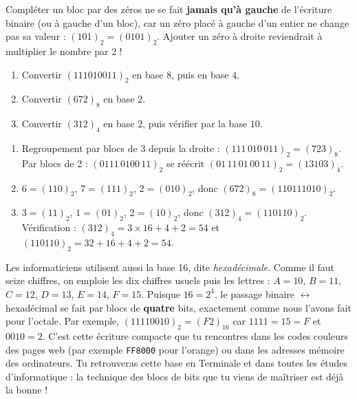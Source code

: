 \documentclass[11pt]{article}
\newcommand{\cle}[1]{{\popxbold\color{popdark}#1}}
\begin{document}
\begin{attention}
Compléter un bloc par des zéros ne se fait \textbf{jamais qu'à gauche} de l'écriture binaire (ou à gauche d'un bloc), car un zéro placé à gauche d'un entier ne change pas sa valeur : $(101)_2 = (0101)_2$. Ajouter un zéro à droite reviendrait à multiplier le nombre par $2$ !
\end{attention}

\begin{exercice}
\begin{enumerate}
\item Convertir $(111010011)_2$ en base $8$, puis en base $4$.
\item Convertir $(672)_8$ en base $2$.
\item Convertir $(312)_4$ en base $2$, puis vérifier par la base $10$.
\end{enumerate}
\end{exercice}

\begin{corrige}
\begin{enumerate}
\item Regroupement par blocs de 3 depuis la droite : $(111\,010\,011)_2 = (723)_8$. Par blocs de 2 : $(0111\,0100\,11)_2$ se réécrit $(01\,11\,01\,00\,11)_2 = (13103)_4$.
\item $6 = (110)_2$, $7 = (111)_2$, $2 = (010)_2$, donc $(672)_8 = (110111010)_2$.
\item $3 = (11)_2$, $1 = (01)_2$, $2 = (10)_2$, donc $(312)_4 = (110110)_2$. Vérification : $(312)_4 = 3\times 16 + 4 + 2 = 54$ et $(110110)_2 = 32 + 16 + 4 + 2 = 54$.
\end{enumerate}
\end{corrige}

\begin{savaistu}
Les informaticiens utilisent aussi la \cle{base 16}, dite \emph{hexadécimale}. Comme il faut seize chiffres, on emploie les dix chiffres usuels puis les lettres : $A = 10$, $B = 11$, $C = 12$, $D = 13$, $E = 14$, $F = 15$. Puisque $16 = 2^4$, le passage binaire $\leftrightarrow$ hexadécimal se fait par blocs de \textbf{quatre} bits, exactement comme nous l'avons fait pour l'octale. Par exemple, $(11110010)_2 = (F2)_{16}$ car $1111 = 15 = F$ et $0010 = 2$. C'est cette écriture compacte que tu rencontres dans les codes couleurs des pages web (par exemple \texttt{FF8000} pour l'orange) ou dans les adresses mémoire des ordinateurs. Tu retrouveras cette base en Terminale et dans toutes les études d'informatique : la technique des blocs de bits que tu viens de maîtriser est déjà la bonne !
\end{savaistu}
\end{document}
